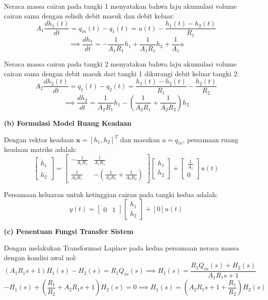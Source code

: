 \documentclass[11pt,a4paper]{article}
\begin{document}
Neraca massa cairan pada tangki 1 menyatakan bahwa laju akumulasi volume cairan sama dengan selisih debit masuk dan debit keluar:
$$A_1 \frac{dh_1(t)}{dt} = q_{in}(t) - q_1(t) = u(t) - \frac{h_1(t) - h_2(t)}{R_1}$$
$$\implies \frac{dh_1}{dt} = -\frac{1}{A_1 R_1} h_1 + \frac{1}{A_1 R_1} h_2 + \frac{1}{A_1} u$$

Neraca massa cairan pada tangki 2 menyatakan bahwa laju akumulasi volume cairan sama dengan debit masuk dari tangki 1 dikurangi debit keluar tangki 2:
$$A_2 \frac{dh_2(t)}{dt} = q_1(t) - q_2(t) = \frac{h_1(t) - h_2(t)}{R_1} - \frac{h_2(t)}{R_2}$$
$$\implies \frac{dh_2}{dt} = \frac{1}{A_2 R_1} h_1 - \left( \frac{1}{A_2 R_1} + \frac{1}{A_2 R_2} \right) h_2$$

\textbf{(b) Formulasi Model Ruang Keadaan}

Dengan vektor keadaan $\mathbf{x} = [h_1, h_2]^T$ dan masukan $u = q_{in}$, persamaan ruang keadaan matriks adalah:
$$\begin{bmatrix} \dot{h}_1 \\ \dot{h}_2 \end{bmatrix} = \begin{bmatrix} -\frac{1}{A_1 R_1} & \frac{1}{A_1 R_1} \\ \frac{1}{A_2 R_1} & -\left(\frac{1}{A_2 R_1} + \frac{1}{A_2 R_2}\right) \end{bmatrix} \begin{bmatrix} h_1 \\ h_2 \end{bmatrix} + \begin{bmatrix} \frac{1}{A_1} \\ 0 \end{bmatrix} u(t)$$

Persamaan keluaran untuk ketinggian cairan pada tangki kedua adalah:
$$y(t) = \begin{bmatrix} 0 & 1 \end{bmatrix} \begin{bmatrix} h_1 \\ h_2 \end{bmatrix} + [0] u(t)$$

\textbf{(c) Penentuan Fungsi Transfer Sistem}

Dengan melakukan Transformasi Laplace pada kedua persamaan neraca massa dengan kondisi awal nol:
$$(A_1 R_1 s + 1) H_1(s) - H_2(s) = R_1 Q_{in}(s) \implies H_1(s) = \frac{R_1 Q_{in}(s) + H_2(s)}{A_1 R_1 s + 1}$$
$$-H_1(s) + \left( \frac{R_1}{R_2} + A_2 R_1 s + 1 \right) H_2(s) = 0 \implies H_1(s) = \left( A_2 R_1 s + 1 + \frac{R_1}{R_2} \right) H_2(s)$$
\end{document}
